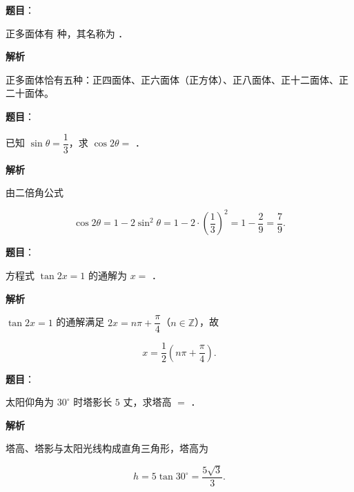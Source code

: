 \begin{answer}

\textbf{题目}：

正多面体有 \gkblank{} 种，其名称为 \gkblank{}．

\textbf{解析}

正多面体恰有五种：正四面体、正六面体（正方体）、正八面体、正十二面体、正二十面体。


\end{answer}
\begin{answer}

\textbf{题目}：

已知 $\sin\theta=\dfrac13$，求 $\cos2\theta=$ \gkblank{}．

\textbf{解析}

由二倍角公式

\nopagebreak[4]
\[
\cos2\theta=1-2\sin^2\theta=1-2\cdot\left(\dfrac13\right)^2=1-\dfrac29=\dfrac79.
\]


\end{answer}
\begin{answer}

\textbf{题目}：

方程式 $\tan2x=1$ 的通解为 $x=$ \gkblank{}．

\textbf{解析}

$\tan2x=1$ 的通解满足 $2x=n\pi+\dfrac\pi4$（$n\in\mathbb Z$），故

\nopagebreak[4]
\[
x=\dfrac12\left(n\pi+\dfrac\pi4\right).
\]


\end{answer}
\begin{answer}

\textbf{题目}：

太阳仰角为 $30^\circ$ 时塔影长 $5$ 丈，求塔高 $=$ \gkblank{}．

\textbf{解析}

塔高、塔影与太阳光线构成直角三角形，塔高为

\nopagebreak[4]
\[
h=5\tan30^\circ=\dfrac{5\sqrt3}{3}.
\]


\end{answer}
